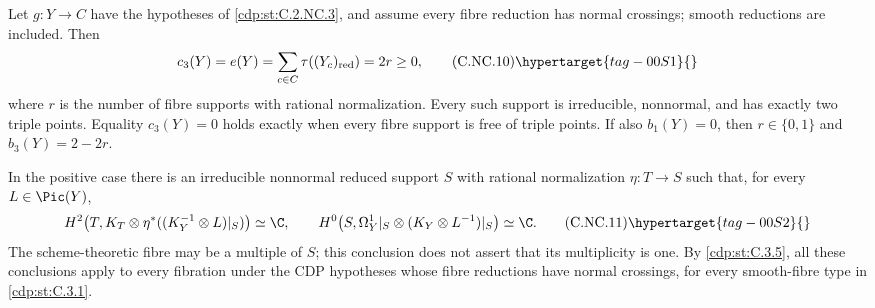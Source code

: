 \begin{proposition}\hypertarget{tag-01CC}{}\label{cdp:st:C.2.NC.5}

Let $g:Y\to C$ have the hypotheses of \ref{cdp:st:C.2.NC.3}, and assume every fibre reduction has normal crossings; smooth reductions are included. Then
\[
 c_3(Y)=e(Y)=\sum_{c\in C}\tau((Y_c)_{\rm red})=2r\ge0,
 \tag{C.NC.10}\hypertarget{tag-00S1}{}\label{cdp:eq:C.NC.10}
\]
where $r$ is the number of fibre supports with rational normalization. Every such support is irreducible, nonnormal, and has exactly two triple points. Equality $c_3(Y)=0$ holds exactly when every fibre support is free of triple points. If also $b_1(Y)=0$, then $r\in\{0,1\}$ and $b_3(Y)=2-2r$.

In the positive case there is an irreducible nonnormal reduced support $S$ with rational normalization $\eta:T\to S$ such that, for every $L\in\Pic(Y)$,
\[
 H^2\!\left(T,K_T\otimes\eta^*((K_Y^{-1}\otimes L)|_S)\right)\simeq\C,
 \qquad
 H^0\!\left(S,\Omega_Y^1|_S\otimes(K_Y\otimes L^{-1})|_S\right)\simeq\C.
 \tag{C.NC.11}\hypertarget{tag-00S2}{}\label{cdp:eq:C.NC.11}
\]
The scheme-theoretic fibre may be a multiple of $S$; this conclusion does not assert that its multiplicity is one. By \ref{cdp:st:C.3.5}, all these conclusions apply to every fibration under the CDP hypotheses whose fibre reductions have normal crossings, for every smooth-fibre type in \ref{cdp:st:C.3.1}.
\end{proposition}


